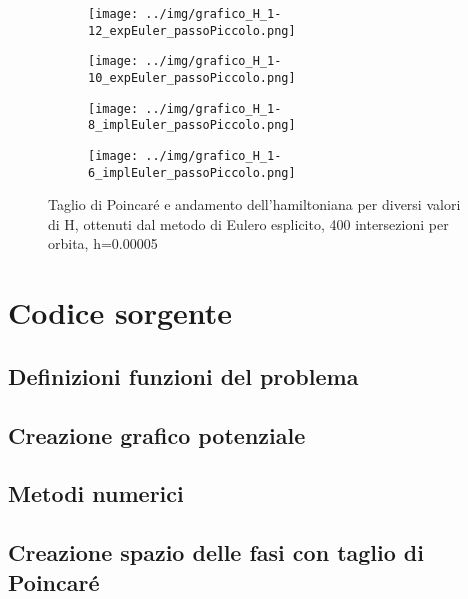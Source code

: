 \documentclass[a4paper, 12pt]{article}
\numberwithin{equation}{section}
\numberwithin{figure}{section}
\begin{document}
\begin{figure}[h!]
	\centering
	\begin{subfigure}[t]{.49\textwidth}
		\centering
		\texttt{[image: ../img/grafico\_H\_1-12\_expEuler\_passoPiccolo.png]}
	\end{subfigure}
	\begin{subfigure}[t]{.49\textwidth}
		\centering
		\texttt{[image: ../img/grafico\_H\_1-10\_expEuler\_passoPiccolo.png]}
	\end{subfigure}
	\begin{subfigure}[t]{.49\textwidth}
		\centering
		\texttt{[image: ../img/grafico\_H\_1-8\_implEuler\_passoPiccolo.png]}
	\end{subfigure}
	\begin{subfigure}[t]{.49\textwidth}
		\centering
		\texttt{[image: ../img/grafico\_H\_1-6\_implEuler\_passoPiccolo.png]}
	\end{subfigure}

	\caption{Taglio di Poincaré e andamento dell'hamiltoniana per diversi valori di H,
	ottenuti dal metodo di Eulero esplicito, 400 intersezioni per orbita, h=0.00005}
	\label{img:euleroesplicitopiccolo}
\end{figure}

\clearpage
\section{Codice sorgente}
\subsection{Definizioni funzioni del problema}


\subsection{Creazione grafico potenziale}

\clearpage

\subsection{Metodi numerici}



\clearpage

\subsection{Creazione spazio delle fasi con taglio di Poincaré}


\clearpage
\printbibliography
\end{document}

